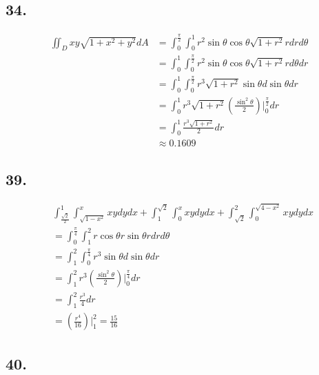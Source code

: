 \documentclass{article}
\begin{document}
  \subsection*{34. }

  $$\begin{aligned}
    \iint_D xy \sqrt{1 + x^2 + y^2} dA &= \int_0^{\frac \pi 2} \int_0^1 r^2 \sin \theta \cos \theta \sqrt{1 + r^2} r dr d\theta \\ 
    &= \int_0^1 \int_0^{\frac \pi 2} r^2 \sin \theta \cos \theta \sqrt{1 + r^2} r  d\theta dr \\
    &= \int_0^1 \int_0^{\frac \pi 2} r^3 \sqrt{1+r^2} \sin \theta d \sin \theta dr \\
    &= \int_0^1 r^3 \sqrt{1+r^2}(\frac{\sin^2 \theta}{2})\biggl|_{0}^{\frac \pi 2} dr \\
    &= \int_0^1 \frac{r^3\sqrt{1+r^2}}{2} dr \\
    &\approx 0.1609
  \end{aligned}$$

  \subsection*{39. }

  $$\begin{aligned}
    &\int_{\frac{\sqrt 2}{2}}^1 \int_{\sqrt{1-x^2}}^x xy dy dx + \int_1^{\sqrt 2} \int_0^x xy dy dx + \int_{\sqrt 2}^2 \int_0^{\sqrt{4-x^2}} xy dy dx \\
    &= \int_0^{\frac \pi 4} \int_1^2 r\cos \theta r \sin \theta r dr d\theta \\
    &= \int_1^2 \int_0^{\frac \pi 4} r^3 \sin \theta d\sin \theta dr \\
    &= \int_1^2 r^3 (\frac{\sin^2 \theta}{2})\biggl|_0^{\frac \pi 4} dr \\
    &= \int_1^2 \frac{r^3}{4} dr \\
    &= (\frac{r^4}{16})\biggl|_1^2 = \frac{15}{16}
  \end{aligned}$$

  \subsection*{40. }
\end{document}

